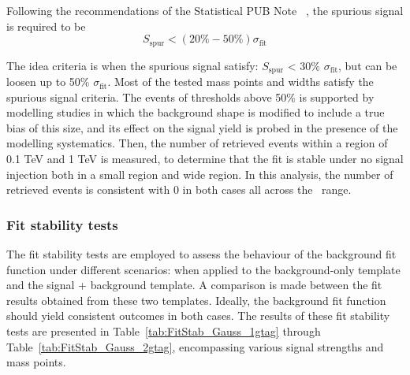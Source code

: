 %

Following the recommendations of the Statistical PUB Note~\cite{ATL-PHYS-PUB-2020-028}
, the spurious signal is required to be
\begin{equation}
 S_\mathrm{spur} < (20\% - 50\%)\sigma_\mathrm{fit}
\end{equation}

The idea criteria is when the spurious signal satisfy: $S_\mathrm{spur}$ < 30\% $\sigma_\mathrm{fit}$, but can be loosen up to 50\% $\sigma_\mathrm{fit}$. Most of the tested mass points and widths satisfy the spurious signal criteria. The events of thresholds above 50\% is supported by modelling studies in which the background shape is modified to include a true bias of this size, and its effect on the signal yield is probed in the presence of the modelling systematics. Then, the number of retrieved events within a region of 0.1 TeV and 1 TeV is measured, to determine that the fit is stable under no signal injection both in a small region and wide region. In this analysis, the number of retrieved events is consistent with 0 in both cases all across the \mjj~range.

\FloatBarrier

\subsubsection{Fit stability tests}
The fit stability tests are employed to assess the behaviour of the background fit function under different scenarios: when applied to the background-only template and the signal + background template. A comparison is made between the fit results obtained from these two templates. Ideally, the background fit function should yield consistent outcomes in both cases. The results of these fit stability tests are presented in Table~\ref{tab:FitStab_Gauss_1gtag} through Table~\ref{tab:FitStab_Gauss_2gtag}, encompassing various signal strengths and mass points.

